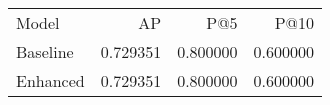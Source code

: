 \begin{tabular}{lrrr}
Model & AP & P@5 & P@10 \\
Baseline & 0.729351 & 0.800000 & 0.600000 \\
Enhanced & 0.729351 & 0.800000 & 0.600000 \\
\end{tabular}
